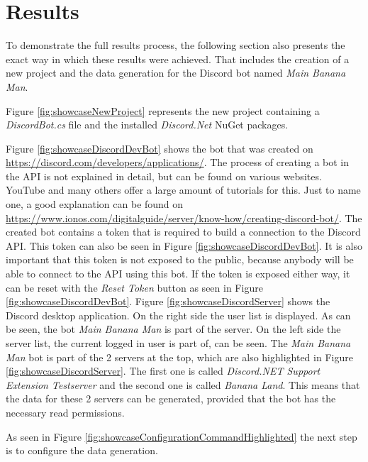 \section{Results}
\label{sec:Results}
To demonstrate the full results process, the following section also presents the exact way in which these results were achieved. That includes the creation of a new project and the data generation for the Discord bot named \textit{Main Banana Man}.

Figure \ref{fig:showcaseNewProject} represents the new project containing a \textit{DiscordBot.cs} file and the installed \textit{Discord.Net} NuGet packages.

Figure \ref{fig:showcaseDiscordDevBot} shows the bot that was created on \url{https://discord.com/developers/applications/}. The process of creating a bot in the API is not explained in detail, but can be found on various websites. YouTube and many others offer a large amount of tutorials for this. Just to name one, a good explanation can be found on \url{https://www.ionos.com/digitalguide/server/know-how/creating-discord-bot/}. The created bot contains a token that is required to build a connection to the Discord API. This token can also be seen in Figure \ref{fig:showcaseDiscordDevBot}. It is also important that this token is not exposed to the public, because anybody will be able to connect to the API using this bot. If the token is exposed either way, it can be reset with the \textit{Reset Token} button as seen in Figure \ref{fig:showcaseDiscordDevBot}.
Figure \ref{fig:showcaseDiscordServer} shows the Discord desktop application. On the right side the user list is displayed. As can be seen, the bot \textit{Main Banana Man} is part of the server. On the left side the server list, the current logged in user is part of, can be seen. The \textit{Main Banana Man} bot is part of the 2 servers at the top, which are also highlighted in Figure \ref{fig:showcaseDiscordServer}. The first one is called \textit{Discord.NET Support Extension Testserver} and the second one is called \textit{Banana Land}. This means that the data for these 2 servers can be generated, provided that the bot has the necessary read permissions. 

As seen in Figure \ref{fig:showcaseConfigurationCommandHighlighted} the next step is to configure the data generation.

